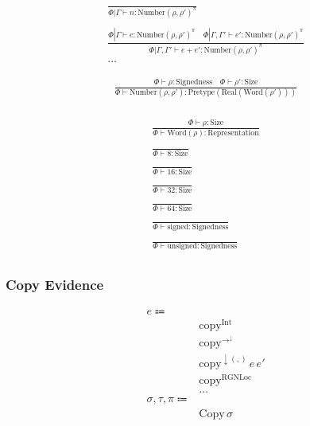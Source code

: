 \documentclass {article}
\begin{document}
\begin{gather*}
\frac
{}
{\Phi | \Gamma \vdash n : \text{Number}(\rho, \rho')^\pi} \\
\\
\frac
{\Phi | \Gamma \vdash e : \text{Number}(\rho, \rho')^\pi \quad \Phi | \Gamma, \Gamma' \vdash e' : \text{Number}(\rho, \rho')^\pi}
{\Phi | \Gamma, \Gamma' \vdash e + e' : \text{Number}(\rho, \rho')^\pi} \\
\dots
\end{gather*}

\begin{gather*}
\frac
{\Phi \vdash \rho : \text{Signedness} \quad \Phi \vdash \rho' : \text{Size}}
{\Phi \vdash \text{Number} (\rho, \rho') : \text{Pretype} (\text{Real} (\text{Word} (\rho'))) } \\
\end{gather*}

\begin{gather*}
\frac
{\Phi \vdash \rho : \text{Size}}
{\Phi \vdash \text{Word} (\rho) : \text{Representation}} \\
\\
\frac
{}
{\Phi \vdash 8 : \text{Size}} \\
\\
\frac
{}
{\Phi \vdash 16 : \text{Size}} \\
\\
\frac
{}
{\Phi \vdash 32 : \text{Size}} \\
\\
\frac
{}
{\Phi \vdash 64 : \text{Size}} \\
\\
\frac
{}
{\Phi \vdash \text{signed} : \text{Signedness}} \\
\\
\frac
{}
{\Phi \vdash \text{unsigned} : \text{Signedness}} \\
\end{gather*}


\subsubsection{Copy Evidence}
\begin{align*}
e \Coloneqq & \\
& \text{copy}^\text{Int} \tag{Copy Integer Proof} \\
& \text{copy}^{\to^\downarrow} \tag{Copy Function Pointer Proof} \\
& \text{copy}^{\downarrow(,)} \, e \, e' \tag{Copy Tuple Proof} \\
& \text{copy}^{\text{RGNLoc}} \tag{Copy Reference Proof}\\
& \dots \\
\sigma, \tau, \pi \Coloneqq & \\
& \text{Copy} \, \sigma \tag{Runtime Copyable} \\
\end{align*}
\end{document}
